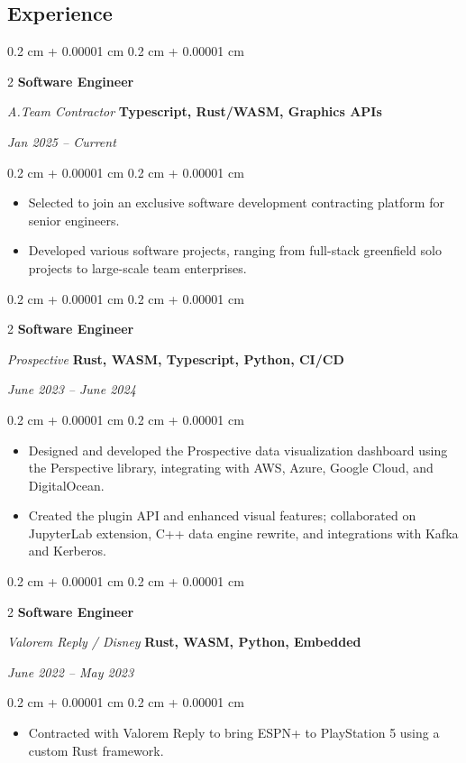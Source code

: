 \documentclass[10pt, letterpaper]{article}
\newenvironment{highlights}{ \begin{itemize}[ topsep=0.10 cm, parsep=0.10 cm, partopsep=0pt,
itemsep=0pt, leftmargin=0.4 cm + 10pt ] }{ \end{itemize} } %
\newenvironment{onecolentry}{ \begin{adjustwidth}{ 0.2 cm + 0.00001 cm }{ 0.2 cm + 0.00001 cm }
}{ \end{adjustwidth}} %
\newenvironment{twocolentry}[2][]{ \onecolentry \def\secondColumn{#2} \setcolumnwidth{\fill, 10 cm}
\begin{paracol}{2} }{ \switchcolumn \raggedleft \secondColumn \end{paracol}
\endonecolentry } %
\begin{document}
	\begin{samepage}
		\section{Experience}

		\newenvironment{experienceSection}[4]{
		\begin{twocolentry}
			{ \textbf{#4}

			\textit{#2}} \textbf{#3}

			\textit{#1}
		\end{twocolentry}

		\vspace{0.10 cm}
		\begin{onecolentry} \begin{highlights} }{ \end{highlights} \end{onecolentry}
		\vspace{0.2cm}
		}

		\begin{experienceSection}
			{A.Team Contractor}{Jan 2025 -- Current}{Software Engineer}{Typescript, Rust/WASM, Graphics APIs}
			\item Selected to join an exclusive software development contracting
			platform for senior engineers. \item Developed various software projects,
			ranging from full-stack greenfield solo projects to large-scale team
			enterprises.
		\end{experienceSection}

		\begin{experienceSection}
			{Prospective}{June 2023 -- June 2024}{Software Engineer}{Rust, WASM, Typescript, Python, CI/CD}
			\item Designed and developed the Prospective data visualization dashboard
			using the Perspective library, integrating with AWS, Azure, Google Cloud,
			and DigitalOcean.

			\item Created the plugin API and enhanced visual features; collaborated on
			JupyterLab extension, C++ data engine rewrite, and integrations with Kafka
			and Kerberos.
		\end{experienceSection}

		\begin{experienceSection}
			{Valorem Reply / Disney}{June 2022 -- May 2023}{Software Engineer}{Rust, WASM, Python, Embedded}
			\item Contracted with Valorem Reply to bring ESPN+ to PlayStation 5 using a
			custom Rust framework.


\end{experienceSection}
\end{samepage}
\end{document}
